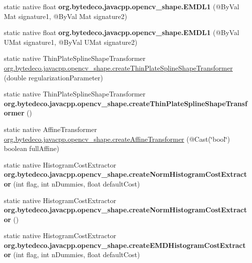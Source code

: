 \begin{DoxyCompactItemize}
\item 
\mbox{\label{group__shape_ga24080e2f6dd6ce97e090cd942d26e5bd}} 
static native float {\bfseries org.\+bytedeco.\+javacpp.\+opencv\+\_\+shape.\+E\+M\+D\+L1} (@By\+Val Mat signature1, @By\+Val Mat signature2)
\item 
\mbox{\label{group__shape_ga10fb6abffe2809f8e22fde70122256da}} 
static native float {\bfseries org.\+bytedeco.\+javacpp.\+opencv\+\_\+shape.\+E\+M\+D\+L1} (@By\+Val U\+Mat signature1, @By\+Val U\+Mat signature2)
\item 
static native Thin\+Plate\+Spline\+Shape\+Transformer \hyperlink{group__shape_ga409dbca0ecf803197cc29ec102f593fd}{org.\+bytedeco.\+javacpp.\+opencv\+\_\+shape.\+create\+Thin\+Plate\+Spline\+Shape\+Transformer} (double regularization\+Parameter)
\item 
\mbox{\label{group__shape_ga9f89fda10806d5f98d65b1a0a82d7bba}} 
static native Thin\+Plate\+Spline\+Shape\+Transformer {\bfseries org.\+bytedeco.\+javacpp.\+opencv\+\_\+shape.\+create\+Thin\+Plate\+Spline\+Shape\+Transformer} ()
\item 
static native Affine\+Transformer \hyperlink{group__shape_gaf6ba7c375194bc18e7f3212dfadfa68f}{org.\+bytedeco.\+javacpp.\+opencv\+\_\+shape.\+create\+Affine\+Transformer} (@Cast(\char`\"{}bool\char`\"{}) boolean full\+Affine)
\item 
\mbox{\label{group__shape_ga9faadffc8c27c6ac18d645eadf7ed086}} 
static native Histogram\+Cost\+Extractor {\bfseries org.\+bytedeco.\+javacpp.\+opencv\+\_\+shape.\+create\+Norm\+Histogram\+Cost\+Extractor} (int flag, int n\+Dummies, float default\+Cost)
\item 
\mbox{\label{group__shape_ga50f2a464bc9171701a3386a986bb5d0f}} 
static native Histogram\+Cost\+Extractor {\bfseries org.\+bytedeco.\+javacpp.\+opencv\+\_\+shape.\+create\+Norm\+Histogram\+Cost\+Extractor} ()
\item 
\mbox{\label{group__shape_gaa4e869f0f953440a5fef1690fb0ce578}} 
static native Histogram\+Cost\+Extractor {\bfseries org.\+bytedeco.\+javacpp.\+opencv\+\_\+shape.\+create\+E\+M\+D\+Histogram\+Cost\+Extractor} (int flag, int n\+Dummies, float default\+Cost)

\end{DoxyCompactItemize}
